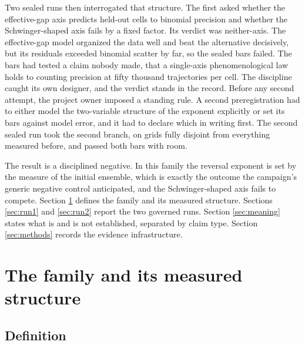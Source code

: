 \documentclass[aps,prd,reprint,nofootinbib,longbibliography]{revtex4-2}
\begin{document}
Two sealed runs then interrogated that structure.  The first asked whether
the effective-gap axis predicts held-out cells to binomial precision and
whether the Schwinger-shaped axis fails by a fixed factor.  Its verdict
was neither-axis.  The effective-gap model organized the data well and
beat the alternative decisively, but its residuals exceeded binomial
scatter by far, so the sealed bars failed.  The bars had tested a claim
nobody made, that a single-axis phenomenological law holds to counting
precision at fifty thousand trajectories per cell.  The discipline caught
its own designer, and the verdict stands in the record.  Before any
second attempt, the project owner imposed a standing rule.  A second
preregistration had to either model the two-variable structure of the
exponent explicitly or set its bars against model error, and it had to
declare which in writing first.  The second sealed run took the second
branch, on grids fully disjoint from everything measured before, and
passed both bars with room.

The result is a disciplined negative.  In this family the reversal
exponent is set by the measure of the initial ensemble, which is exactly
the outcome the campaign's generic negative control anticipated, and the
Schwinger-shaped axis fails to compete.  Section \ref{sec:family} defines
the family and its measured structure.  Sections \ref{sec:run1} and
\ref{sec:run2} report the two governed runs.  Section \ref{sec:meaning}
states what is and is not established, separated by claim type.  Section
\ref{sec:methods} records the evidence infrastructure.

\section{The family and its measured structure}
\label{sec:family}

\subsection{Definition}
\end{document}
